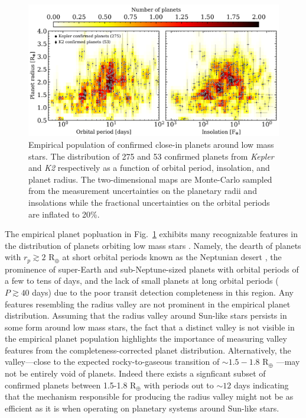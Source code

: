 \documentclass[twocolumn]{emulateapj}
\newcommand{\kepler}[1]{\emph{Kepler}#1}
\newcommand{\ktwo}[1]{\emph{K2}#1}
\begin{document}
\begin{figure}
  \centering
  \includegraphics[width=0.98\hsize]{figures/Ndetmap_Msgt0d0_xbin45_ybin27.png}
  \caption{Empirical population of confirmed close-in planets around low mass stars.
    The distribution of 275 and 53 confirmed planets from \kepler{}
    and \ktwo{} respectively as a function of orbital period, insolation, and planet radius. The two-dimensional maps are
    Monte-Carlo sampled from the measurement uncertainties on the planetary radii and insolations while 
    the fractional uncertainties on the orbital periods are inflated to
    20\%.} %
  \label{fig:Ndet}
\end{figure}





The empirical planet popluation in Fig.~\ref{fig:Ndet} exhibits many recognizable features in the distribution of
planets orbiting low mass stars \citep[e.g.][]{morton14,dressing15a,gaidos16}. Namely, the dearth of planets with
$r_p\gtrsim 2$ R$_{\oplus}$ at short orbital periods known as the Neptunian desert \citep{lundkvist16,mazeh16},
the prominence of super-Earth and sub-Neptune-sized planets with orbital periods of a few to tens of days,
and the lack of small planets at long orbital periods ($P\gtrsim 40$ days) due to the poor transit detection
completeness in this region. Any features resembling the radius valley are not prominent in the empirical planet
distribution. Assuming that the radius valley around Sun-like stars persists in some form around low
mass stars, the fact that a distinct valley is not visible in the empirical planet population
highlights the importance of measuring valley
features from the completeness-corrected planet distribution. Alternatively, the valley---close to the expected rocky-to-gaseous
transition of $\sim 1.5-1.8$ R$_{\oplus}$ \citep{weiss14}---may not be entirely void of planets. Indeed there exists a
signficant subset of confirmed planets between 1.5-1.8 R$_{\oplus}$ with periods out to $\sim 12$ days indicating that
the mechanism responsible for producing the radius valley might not be as efficient as it is when operating on planetary
systems around Sun-like stars.
\end{document}
